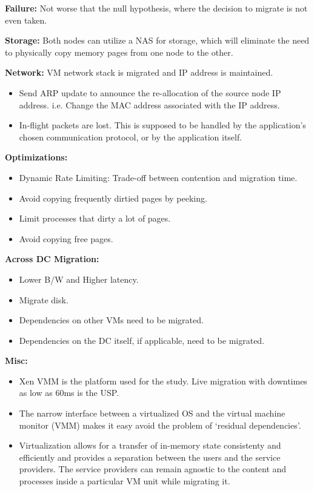 \documentclass[parskip=half]{scrartcl}
\begin{document}
        \textbf{Failure:} Not worse that the null hypothesis, where the decision to migrate is not even taken.

        \textbf{Storage:} Both nodes can utilize a NAS for storage, which will eliminate the need to physically copy memory pages from one node to the other.

        \textbf{Network:} VM network stack is migrated and IP address is maintained.
        \begin{itemize}
            \item Send ARP update to announce the re-allocation of the source node IP address. i.e. Change the MAC address associated with the IP address.
            \item In-flight packets are lost. This is supposed to be handled by the application's chosen communication protocol, or by the application itself.
        \end{itemize}

        \textbf{Optimizations:}
        \begin{itemize}
            \item Dynamic Rate Limiting: Trade-off between contention and migration time.
            \item Avoid copying frequently dirtied pages by peeking.
            \item Limit processes that dirty a lot of pages.
            \item Avoid copying free pages.
        \end{itemize}

        \textbf{Across DC Migration:}
        \begin{itemize}
            \item Lower B/W and Higher latency.
            \item Migrate disk.
            \item Dependencies on other VMs need to be migrated.
            \item Dependencies on the DC itself, if applicable, need to be migrated.
        \end{itemize}

        \textbf{Misc:}
        \begin{itemize}
            \item Xen VMM is the platform used for the study. Live migration with downtimes as low as 60ms is the USP.
            \item The narrow interface between a virtualized OS and the virtual machine monitor (VMM) makes it easy avoid the problem of ‘residual dependencies’.
            \item Virtualization allows for a transfer of in-memory state consistenty and efficiently and provides a separation between the users and the service providers. The service providers can remain agnostic to the content and processes inside a particular VM unit while migrating it.
        \end{itemize}
\end{document}
